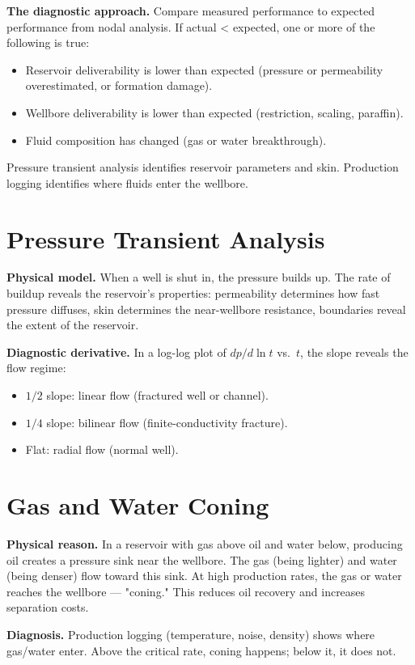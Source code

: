 \documentclass[11pt,a4paper,openany]{book}
\begin{document}
\begin{theory}
\textbf{The diagnostic approach.} Compare measured performance to
expected performance from nodal analysis. If actual < expected, one or
more of the following is true:
\begin{itemize}
  \item Reservoir deliverability is lower than expected (pressure or
        permeability overestimated, or formation damage).
  \item Wellbore deliverability is lower than expected (restriction,
        scaling, paraffin).
  \item Fluid composition has changed (gas or water breakthrough).
\end{itemize}

Pressure transient analysis identifies reservoir parameters and skin.
Production logging identifies where fluids enter the wellbore.
\end{theory}

\section{Pressure Transient Analysis}

\begin{theory}
\textbf{Physical model.} When a well is shut in, the pressure builds
up. The rate of buildup reveals the reservoir's properties: permeability
determines how fast pressure diffuses, skin determines the near-wellbore
resistance, boundaries reveal the extent of the reservoir.

\textbf{Diagnostic derivative.} In a log-log plot of $dp/d\ln t$ vs.\
$t$, the slope reveals the flow regime:
\begin{itemize}
  \item $1/2$ slope: linear flow (fractured well or channel).
  \item $1/4$ slope: bilinear flow (finite-conductivity fracture).
  \item Flat: radial flow (normal well).
\end{itemize}
\end{theory}

\section{Gas and Water Coning}

\begin{theory}
\textbf{Physical reason.} In a reservoir with gas above oil and water
below, producing oil creates a pressure sink near the wellbore. The
gas (being lighter) and water (being denser) flow toward this sink.
At high production rates, the gas or water reaches the wellbore —
"coning." This reduces oil recovery and increases separation costs.

\textbf{Diagnosis.} Production logging (temperature, noise, density)
shows where gas/water enter. Above the critical rate, coning happens;
below it, it does not.
\end{theory}
\end{document}
